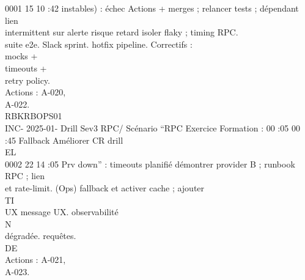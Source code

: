 \documentclass[12pt,landscape,a4paper]{article}
\begin{document}
0001 15 10 :42                          instables) : échec   Actions + merges ;                    relancer tests ;   dépendant         lien\\
intermittent sur     alerte    risque retard               isoler flaky ;     timing RPC.\\
suite e2e.           Slack     sprint.                     hotfix pipeline.   Correctifs :\\
mocks +\\
timeouts +\\
retry policy.\\
Actions : A-020,\\
A-022.\\
RBKRBOPS01\\
INC- 2025-01- Drill     Sev3    RPC/    Scénario “RPC    Exercice      Formation : 00 :05 00 :45 Fallback             Améliorer         CR drill\\
\vspace{0.5em}
\vspace{0.5em}
\vspace{0.5em}
\vspace{0.5em}
EL\\
0002 22 14 :05                  Prv     down” : timeouts planifié      démontrer                    provider B ;      runbook RPC ; lien\\
et rate-limit.   (Ops)         fallback et                  activer cache ; ajouter\\
\vspace{0.5em}
\vspace{0.5em}
\vspace{0.5em}
\vspace{0.5em}
TI\\
UX                           message UX.       observabilité\\
\vspace{0.5em}
\vspace{0.5em}
\vspace{0.5em}
\vspace{0.5em}
N\\
dégradée.                                      requêtes.\\
\vspace{0.5em}
\vspace{0.5em}
\vspace{0.5em}
\vspace{0.5em}
DE\\
Actions : A-021,\\
A-023.\\
\end{document}
